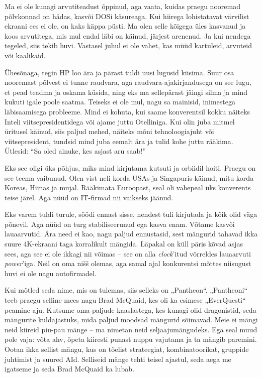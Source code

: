 Ma ei ole kunagi arvutiteadust õppinud, aga vaata, kuidas praegu nooremad 
põlvkonnad on hädas, kasvõi DOSi käsureaga. Kui hiirega lohistatavat 
värvilist ekraani ees ei ole, on kaks käppa püsti. Ma olen selle kõigega 
üles kasvanud ja koos arvutitega, mis mul endal läbi on käinud, järjest 
arenenud. Ja kui nendega tegeled, siis tekib huvi. Vastasel 
juhul ei ole vahet, kas müüd kartuleid, arvuteid või kaalikaid. 

Ühesõnaga, tegin HP loo ära ja pärast tuldi uusi lugusid küsima. Suur osa nooremast 
põlvest ei tunne raudvara, aga raudvara-ajakirjandusega on see lugu, 
et pead teadma ja oskama küsida, ning eks ma sellepärast jäingi 
silma ja mind kukuti igale poole saatma. Teiseks ei ole mul, nagu sa mainisid, inimestega läbisaamisega probleeme. Mind ei kohuta, 
kui saame konverentsil kokku näiteks Inteli viitsepresidentidega või ajame juttu
Otelliniga. Kui olin juba mitmel üritusel käinud, siis paljud mehed, näiteks 
mõni tehnoloogiajuht või viitsepresident, tundsid mind juba eemalt ära ja tulid kohe 
juttu rääkima. Ütlesid: \enquote{Sa oled ainuke, kes asjast aru saab!}

Eks see oligi üks põhjus, miks mind kirjutama kutsuti ja orbiidil hoiti. Praegu 
on see teema vaibunud. Olen vist neli korda USAs ja Singapuris käinud, mitu korda Koreas, Hiinas ja mujal. Rääkimata Euroopast, seal oli
vahepeal üks konverents teise järel. Aga nüüd on IT-firmad nii vaikseks jäänud. 


Eks varem tuldi turule, söödi ennast sisse, nendest tuli kirjutada ja kõik olid väga põnevil. Aga nüüd 
on turg stabiliseerunud ega kasva enam. Võtame kasvõi 
lauaarvutid. Ära need ei kao, nagu paljud ennustasid, sest mängurid 
tahavad ikka suure 4K-ekraani taga korralikult mängida. Läpakal on küll 
päris kõvad asjas sees, aga see ei ole ikkagi nii võimas -- see on alla 
\emph{clock}'itud võrreldes lauaarvuti \emph{power}'iga. Neil on 
oma nišš olemas, aga samal ajal konkurentsi mõttes niisugust huvi ei ole 
nagu autofirmadel.


Kui mõtled seda nime, mis on tulemas, siis selleks on 
„Pantheon“. „Pantheoni“ teeb praegu selline mees nagu Brad McQuaid, kes oli ka 
esimese „EverQuesti“ peamine aju. Kutsume oma paljude 
kaaslastega, kes kunagi olid dragonistid, seda mängurite kuldajastuks, 
mida paljud moodsad mängurid sõimavad. Meie ei mängi neid kiireid 
piu-pau mänge -- ma nimetan neid seljaajumängudeks. Ega seal muud pole vaja: 
võta ahv, õpeta kiiresti punast nuppu vajutama ja ta mängib paremini. Ootan ikka 
sellist mängu, kus on tõelist strateegiat, kombinatoorikat, gruppide juhtimist ja 
suured AId. Selliseid mänge tehti teisel ajastul, seda aega me igatseme 
ja seda Brad McQuaid ka lubab.

